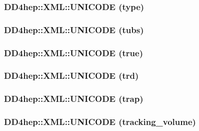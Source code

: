\label{namespace_d_d4hep_1_1_x_m_l_a59abd1d37fc0ca492051b81ed56cb366}
\hypertarget{namespace_d_d4hep_1_1_x_m_l_a4cf4043ff061cf55d8dce92f36341a45}{
\subsubsection[{UNICODE}]{\setlength{\rightskip}{0pt plus 5cm}DD4hep::XML::UNICODE (type)}}
\label{namespace_d_d4hep_1_1_x_m_l_a4cf4043ff061cf55d8dce92f36341a45}
\hypertarget{namespace_d_d4hep_1_1_x_m_l_a2135901b4c1064197d7531e166c6c7a1}{
\subsubsection[{UNICODE}]{\setlength{\rightskip}{0pt plus 5cm}DD4hep::XML::UNICODE (tubs)}}
\label{namespace_d_d4hep_1_1_x_m_l_a2135901b4c1064197d7531e166c6c7a1}
\hypertarget{namespace_d_d4hep_1_1_x_m_l_acb8870e3f346c1088e7754e7e35222e6}{
\subsubsection[{UNICODE}]{\setlength{\rightskip}{0pt plus 5cm}DD4hep::XML::UNICODE (true)}}
\label{namespace_d_d4hep_1_1_x_m_l_acb8870e3f346c1088e7754e7e35222e6}
\hypertarget{namespace_d_d4hep_1_1_x_m_l_ad6ad99ba2edf397c3a1758c2deec0228}{
\subsubsection[{UNICODE}]{\setlength{\rightskip}{0pt plus 5cm}DD4hep::XML::UNICODE (trd)}}
\label{namespace_d_d4hep_1_1_x_m_l_ad6ad99ba2edf397c3a1758c2deec0228}
\hypertarget{namespace_d_d4hep_1_1_x_m_l_a8ec122b4dce94b84b3dc3a8ebfb5a1c5}{
\subsubsection[{UNICODE}]{\setlength{\rightskip}{0pt plus 5cm}DD4hep::XML::UNICODE (trap)}}
\label{namespace_d_d4hep_1_1_x_m_l_a8ec122b4dce94b84b3dc3a8ebfb5a1c5}
\hypertarget{namespace_d_d4hep_1_1_x_m_l_ab293b8cea7878daa0cdfaefe143e05e5}{
\subsubsection[{UNICODE}]{\setlength{\rightskip}{0pt plus 5cm}DD4hep::XML::UNICODE (tracking\_\-volume)}}
